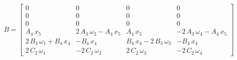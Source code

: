 \begin{equation}
	B = \begin{bmatrix}
			0 & 0 & 0 & 0\\
			0 & 0 & 0 & 0\\
			0 & 0 & 0 & 0\\
			A_4 \,x_5  & 2\,A_3 \,\omega_2 -A_4 \,x_5  & A_4 \,x_5  & -2\,A_3 \,\omega_4 -A_4 \,x_5 \\
			2\,B_3 \,\omega_1 +B_4 \,x_4  & -B_4 \,x_4  & B_4 \,x_4 -2\,B_3 \,\omega_3  & -B_4 \,x_4 \\
			2\,C_2 \,\omega_1  & -2\,C_2 \,\omega_2  & 2\,C_2 \,\omega_3  & -2\,C_2 \,\omega_4 
	\end{bmatrix}
\end{equation}

